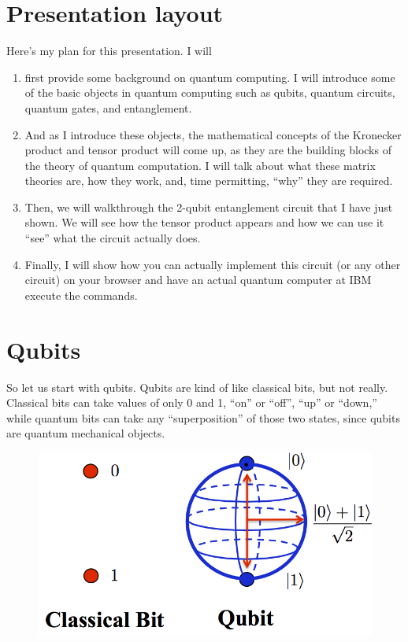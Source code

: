 \documentclass[a4paper,11pt]{article}
\numberwithin{equation}{section}
\theoremstyle{definition}
\begin{document}
\section{Presentation layout}
Here's my plan for this presentation. I will 
\begin{enumerate}
	\item first provide some background on quantum computing. I will introduce some of the basic objects in quantum computing such as qubits, quantum circuits, quantum gates, and entanglement. 
	\item And as I introduce these objects, the mathematical concepts of the Kronecker product and tensor product will come up, as they are the building blocks of the theory of quantum computation. I will talk about what these matrix theories are, how they work, and, time permitting, ``why'' they are required.
	\item  Then, we will walkthrough the 2-qubit entanglement circuit that I have just shown. We will see how the tensor product appears and how we can use it ``see'' what the circuit actually does.
	\item Finally, I will show how you can actually implement this circuit (or any other circuit) on your browser and have an actual quantum computer at IBM execute the commands.
\end{enumerate}

\section{Qubits}
So let us start with qubits. Qubits are kind of like classical bits, but not really. Classical bits can take values of only 0 and 1, ``on'' or ``off'', ``up'' or ``down,'' while quantum bits can take any ``superposition'' of those two states, since qubits are quantum mechanical objects.

\begin{figure}[h!]
	\centering
	\includegraphics[scale=0.5]{atom1.png}
\end{figure}
\end{document}
